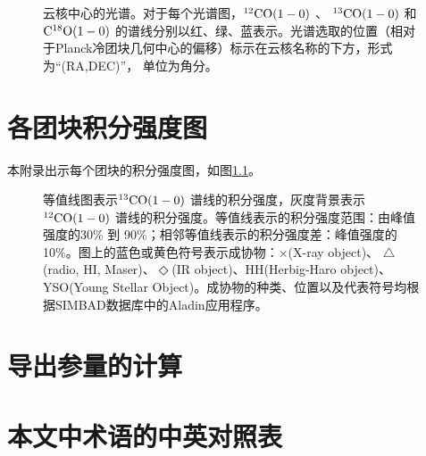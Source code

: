 \documentclass[UTF8, nocolorlinks]{pkuthss}
\newcommand{\coaa}{$\rm^{12}CO(1-0)$ }
\newcommand{\cobb}{$\rm^{13}CO(1-0)$ }
\newcommand{\cocc}{$\rm C^{18}O(1-0)$ }
\begin{document}
	\begin{figure}[h]
		\caption{云核中心的光谱。对于每个光谱图，\coaa 、 \cobb 和 \cocc   的谱线分别以红、绿、蓝表示。光谱选取的位置（相对于Planck冷团块几何中心的偏移）标示在云核名称的下方，形式为“(RA,DEC)”， 单位为角分。\label{Fig.Spectra}}
	\end{figure}
		\vspace{-18mm}


\chapter{各团块积分强度图}\label{App.Map}
	
	本附录出示每个团块的积分强度图，如图\ref{Fig.Map}。

	\begin{figure}[h]
		\caption{等值线图表示\cobb 谱线的积分强度，灰度背景表示\coaa 谱线的积分强度。等值线表示的积分强度范围：由峰值强度的30\% 到 90\%；相邻等值线表示的积分强度差：峰值强度的10\%。图上的蓝色或黄色符号表示成协物：$\times$(X-ray object)、 $\triangle$(radio, {HI}, Maser)、$\Diamond$(IR object)、HH(Herbig-Haro object)、YSO(Young Stellar Object)。成协物的种类、位置以及代表符号均根据SIMBAD数据库中的Aladin应用程序。\label{Fig.Map}}
	\end{figure}
		\vspace{-18mm}

\chapter{导出参量的计算}

\chapter{本文中术语的中英对照表}
\backmatter


\end{document}
